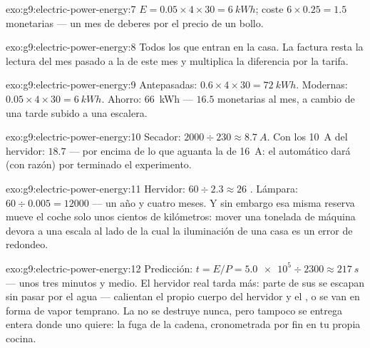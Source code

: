 \begin{solution}{exo:g9:electric-power-energy:7}
$E = 0.05 \times 4 \times 30 = \qty{6}{kWh}$; coste $6 \times 0.25 =
1.5$  monetarias --- un mes de deberes por el precio de un
bollo.
\end{solution}

\begin{solution}{exo:g9:electric-power-energy:8}
Todos los  que entran en la casa. La factura resta la
lectura del mes pasado a la de este mes y multiplica la diferencia por
la tarifa.
\end{solution}

\begin{solution}{exo:g9:electric-power-energy:9}
Antepasadas: $0.6 \times 4 \times 30 = \qty{72}{kWh}$. Modernas: $0.05
\times 4 \times 30 = \qty{6}{kWh}$. Ahorro: \qty{66}{kWh} --- $16.5$
 monetarias al mes, a cambio de una tarde subido a una
escalera.
\end{solution}

\begin{solution}{exo:g9:electric-power-energy:10}
Secador: $2000 \div 230 \approx \qty{8.7}{A}$. Con los \qty{10}{A} del
hervidor: $18.7$ --- por encima de lo que aguanta la  de
\qty{16}{A}: el automático dará (con razón) por terminado el
experimento.
\end{solution}

\begin{solution}{exo:g9:electric-power-energy:11}
Hervidor: $60 \div 2.3 \approx 26$ . Lámpara: $60 \div 0.005
= 12000$  --- un año y cuatro meses. Y sin embargo esa misma
reserva mueve el coche solo unos cientos de kilómetros: mover una
tonelada de máquina devora  a una escala al lado de la cual
la iluminación de una casa es un error de redondeo.
\end{solution}

\begin{solution}{exo:g9:electric-power-energy:12}
Predicción: $t = E/P = \num{5.0e5} \div 2300 \approx \qty{217}{s}$ ---
unos tres minutos y medio. El hervidor real tarda más: parte de sus
 se escapan sin pasar por el agua --- calientan el propio
cuerpo del hervidor y el , o se van en forma de vapor
temprano. La  no se destruye nunca, pero tampoco se entrega
entera donde uno quiere: la fuga de la cadena, cronometrada por fin en
tu propia cocina.
\end{solution}

